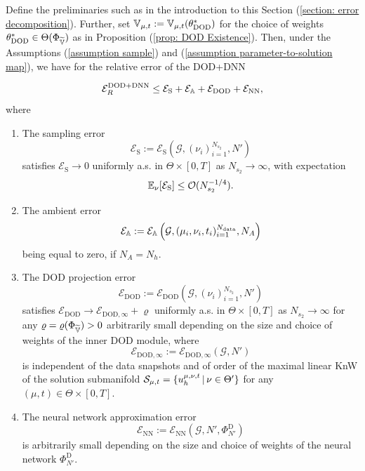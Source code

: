 \begin{theorem} \label{theo: relative error DOD+DNN}
    Define the preliminaries such as in the introduction to this Section (\ref{section: error decomposition}). 
    Further, set $\mathbb{V}_{\mu, t} := \mathbb{V}_{\mu, t}(\theta^*_\text{DOD})$ for the choice of weights $\theta_\text{DOD}^* \in
    \Theta(\Phi_{\widetilde{\mathbb{V}}})$ as in Proposition (\ref{prop: DOD Existence}).
    Then, under the Assumptions (\ref{assumption sample}) and 
    (\ref{assumption parameter-to-solution map}), we have for the relative error of the DOD+DNN
    
    \begin{equation}
        \mathcal{E}^\text{DOD+DNN}_R \leq \mathcal{E}_\text{S} + \mathcal{E}_{\mathbb{A}} 
        + \mathcal{E}_\text{DOD} + \mathcal{E}_\text{NN},
    \end{equation}
    where 
    
    \begin{enumerate}
        \item The sampling error 
        \[
            \mathcal{E}_\text{S} := \mathcal{E}_\text{S}\left(\mathcal{G}, 
            (\nu_i)_{i = 1}^{N_{s_2}}, N'\right)
        \]
        satisfies $\mathcal{E}_\text{S} \to 0$ uniformly a.s. in $\Theta \times [0, T]$ as $N_{s_2} \to \infty$, 
        with expectation 
        \[
            \mathbb{E}_\nu[\mathcal{E}_\text{S}] \leq \mathcal{O}(N_{s_2}^{-1/4}).
        \]
    
        \item The ambient error
        \[
            \mathcal{E}_{\mathbb{A}} := \mathcal{E}_{\mathbb{A}}\left(\mathcal{G}, (\mu_i, \nu_i, t_i)_{i = 1}^{N_{\text{data}}},
            N_A\right)
        \]
        being equal to zero, if $N_A = N_h$.
        \item The DOD projection error 
        \[
            \mathcal{E}_{\text{DOD}} := \mathcal{E}_{\text{DOD}}\left(\mathcal{G}, 
            (\nu_i)_{i = 1}^{N_{s_2}}, N'\right)
        \]
        satisfies $\mathcal{E}_{\text{DOD}} \to \mathcal{E}_{\text{DOD}, \infty} + \varrho$
        uniformly a.s. in $\Theta \times [0, T]$ as $N_{s_2} \to \infty$
        for any $\varrho = \varrho(\Phi_{\widetilde{\mathbb{V}}})> 0$ arbitrarily small depending on
        the size and choice of weights of the inner DOD module, where
        \[
            \mathcal{E}_{\text{DOD}, \infty} := \mathcal{E}_{\text{DOD}, \infty}(\mathcal{G}, N')
        \]
        is independent of the data snapshots and of 
        order of the maximal linear KnW of the solution submanifold 
        $\mathcal{S}_{\mu, t} = \{ u_h^{\mu, \nu, t} \, \vert \, \nu \in \Theta' \}$ for any $(\mu, t) \in \Theta \times [0,T]$.
    
        \item The neural network approximation error
        \[
            \mathcal{E}_{\text{NN}} := \mathcal{E}_{\text{NN}}\left(\mathcal{G}, N', \Phi^\text{D}_{N'}\right)
        \]
        is arbitrarily small depending on the size and choice of weights of the neural network $\Phi^\text{D}_{N'}$.
    \end{enumerate}

\end{theorem}
